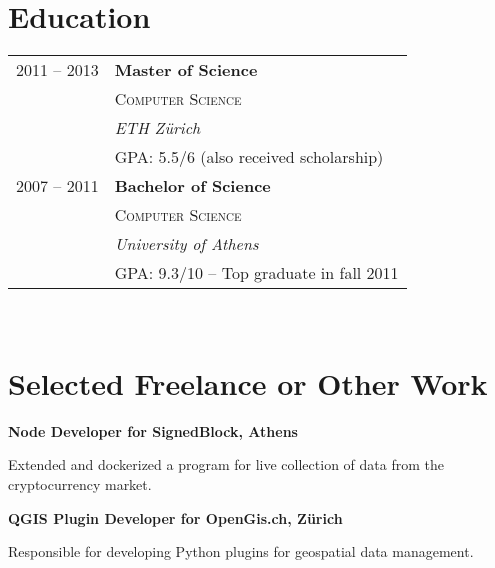 \documentclass[10pt]{article} %
\begin{document}
\begin{minipage}[t]{0.5\textwidth} %
\vspace{0pt} %
	

\section{Education} 

\begin{tabular}{rl} %



2011 -- 2013 & \textbf{Master of Science} \\ 
& \textsc{Computer Science} \\ 
& \textit{ETH Z\"urich}\\
    \small  & GPA: 5.5/6 (also received scholarship) \\
2007 -- 2011 & \textbf{Bachelor of Science}\\
& \textsc{Computer Science} \\
& \textit{University of Athens} \\
\small  & GPA: 9.3/10 -- Top graduate in fall 2011\\
	
\end{tabular}\\[9pt]


\section{Selected Freelance or Other Work} 


{\raggedright\large \textbf{Node Developer for SignedBlock, Athens}\\
}

\normalsize{Extended and dockerized a program for live collection of data from the cryptocurrency market.}
\\

{\raggedright\large \textbf{QGIS Plugin Developer for OpenGis.ch, Z\"urich}\\
}

\normalsize{Responsible for developing Python plugins for geospatial data management.}\\


\end{minipage}
\end{document}
